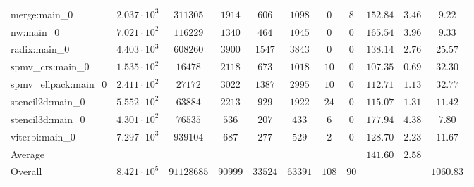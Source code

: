 \begin{tabular}{|l|c|c|c|c|c|c|c|c|c|c|}
merge:main\_0          & $ 2.037 \cdot 10^{3} $ & $ 311305   $ & $ 1914  $ & $ 606   $ & $ 1098  $ & $ 0   $ & $ 8  $ & $ 152.84      $ & $ 3.46    $ & $ 9.22    $ \\
nw:main\_0             & $ 7.021 \cdot 10^{2} $ & $ 116229   $ & $ 1340  $ & $ 464   $ & $ 1045  $ & $ 0   $ & $ 0  $ & $ 165.54      $ & $ 3.96    $ & $ 9.33    $ \\
radix:main\_0          & $ 4.403 \cdot 10^{3} $ & $ 608260   $ & $ 3900  $ & $ 1547  $ & $ 3843  $ & $ 0   $ & $ 0  $ & $ 138.14      $ & $ 2.76    $ & $ 25.57   $ \\
spmv\_crs:main\_0      & $ 1.535 \cdot 10^{2} $ & $ 16478    $ & $ 2118  $ & $ 673   $ & $ 1018  $ & $ 10  $ & $ 0  $ & $ 107.35      $ & $ 0.69    $ & $ 32.30   $ \\
spmv\_ellpack:main\_0  & $ 2.411 \cdot 10^{2} $ & $ 27172    $ & $ 3022  $ & $ 1387  $ & $ 2995  $ & $ 10  $ & $ 0  $ & $ 112.71      $ & $ 1.13    $ & $ 32.77   $ \\
stencil2d:main\_0      & $ 5.552 \cdot 10^{2} $ & $ 63884    $ & $ 2213  $ & $ 929   $ & $ 1922  $ & $ 24  $ & $ 0  $ & $ 115.07      $ & $ 1.31    $ & $ 11.42   $ \\
stencil3d:main\_0      & $ 4.301 \cdot 10^{2} $ & $ 76535    $ & $ 536   $ & $ 207   $ & $ 433   $ & $ 6   $ & $ 0  $ & $ 177.94      $ & $ 4.38    $ & $ 7.80    $ \\
viterbi:main\_0        & $ 7.297 \cdot 10^{3} $ & $ 939104   $ & $ 687   $ & $ 277   $ & $ 529   $ & $ 2   $ & $ 0  $ & $ 128.70      $ & $ 2.23    $ & $ 11.67   $ \\
\hline
Average                & $                    $ & $          $ & $       $ & $       $ & $       $ & $     $ & $    $ & $ 141.60      $ & $ 2.58    $ & $         $ \\
\hline
Overall                & $ 8.421 \cdot 10^{5} $ & $ 91128685 $ & $ 90999 $ & $ 33524 $ & $ 63391 $ & $ 108 $ & $ 90 $ & $             $ & $         $ & $ 1060.83 $ \\
\hline
\end{tabular}

